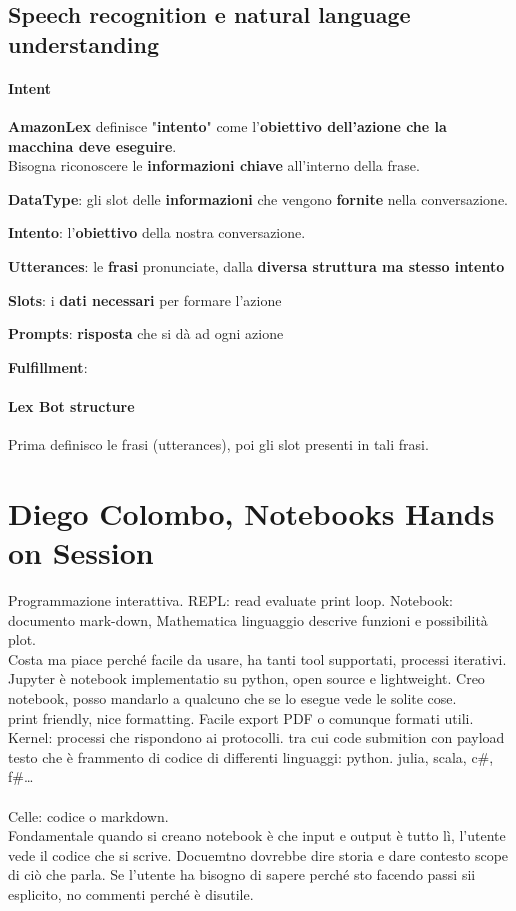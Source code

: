 \documentclass[10pt]{article}
\begin{document}
\subsection{Speech recognition e natural language understanding}
\paragraph{Intent} \textbf{AmazonLex} definisce "\textbf{intento}" come l'\textbf{obiettivo dell'azione che la macchina deve eseguire}.\\
Bisogna riconoscere le \textbf{informazioni chiave} all'interno della frase.
\begin{list}{}{}
	\item \textbf{DataType}: gli slot delle \textbf{informazioni} che vengono \textbf{fornite} nella conversazione.
	\item \textbf{Intento}: l'\textbf{obiettivo} della nostra conversazione.
	\item \textbf{Utterances}: le \textbf{frasi} pronunciate, dalla \textbf{diversa struttura ma stesso intento}
	\item \textbf{Slots}: i \textbf{dati necessari} per formare l'azione
	\item \textbf{Prompts}: \textbf{risposta} che si dà ad ogni azione
	\item \textbf{Fulfillment}: 
\end{list}
\paragraph{Lex Bot structure} Prima definisco le frasi (utterances), poi gli slot presenti in tali frasi.
\section{Diego Colombo, Notebooks Hands on Session}
Programmazione interattiva. REPL: read evaluate print loop. Notebook: documento mark-down, Mathematica linguaggio descrive funzioni e possibilità plot.\\
Costa ma piace perché facile da usare, ha tanti tool supportati, processi iterativi. Jupyter è notebook implementatio su python, open source e lightweight. Creo notebook, posso mandarlo a qualcuno che se lo esegue vede le solite cose.\\
print friendly, nice formatting. Facile export PDF o comunque formati utili.\\
Kernel: processi che rispondono ai protocolli. tra cui code submition con payload testo che è frammento di codice di differenti linguaggi: python. julia, scala, c\#, f\#\ldots\\\\
Celle: codice o markdown.\\
Fondamentale quando si creano notebook è che input e output è tutto lì, l'utente vede il codice che si scrive. Docuemtno dovrebbe dire storia e dare contesto scope di ciò che parla. Se l'utente ha bisogno di sapere perché sto facendo passi sii esplicito, no commenti perché è disutile.
\end{document}
